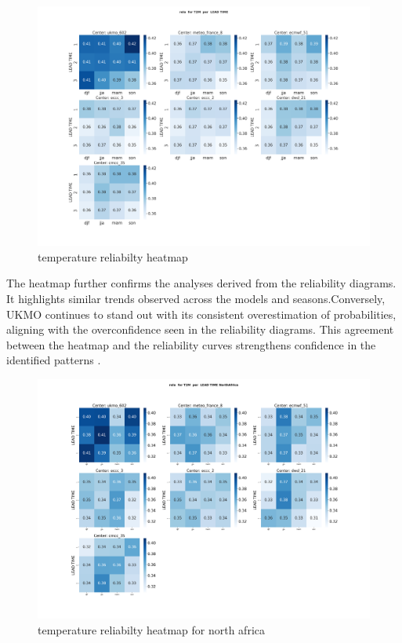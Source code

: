 \begin{figure}[H]
    \centering
    \includegraphics[width=1\linewidth]{plots/prob/rela/rela_T2M.png}
    \caption{temperature reliabilty heatmap}
\end{figure}
The heatmap further confirms the analyses derived from the reliability diagrams. It highlights similar trends observed across the models and seasons.Conversely, UKMO continues to stand out with its consistent overestimation of probabilities, aligning with the overconfidence seen in the reliability diagrams. This agreement between the heatmap and the reliability curves strengthens confidence in the identified patterns .
\begin{figure}[H]
    \centering
    \includegraphics[width=1\linewidth]{plots/prob/rela/rela_T2M_NorthAfrica.png}
    \caption{temperature reliabilty heatmap for north africa}
\end{figure}


